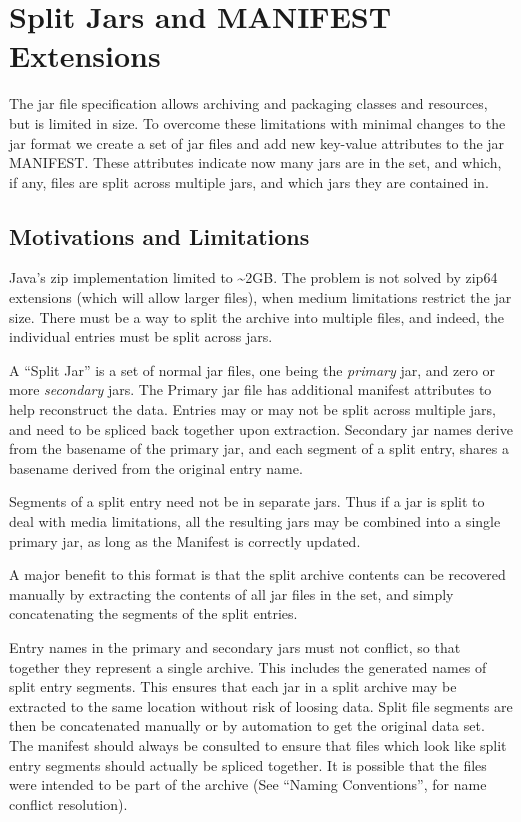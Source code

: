 \documentclass[a4paper, 12pt, pdftex]{report}
\begin{document}

\appendix

\chapter{Split Jars and MANIFEST Extensions}

The jar file specification allows archiving and packaging classes and
resources, but is limited in size. To overcome these limitations with
minimal changes to the jar format we create a set of jar files and add
new key-value attributes to the jar MANIFEST. These attributes
indicate now many jars are in the set, and which, if any, files are
split across multiple jars, and which jars they are contained in.

\section{Motivations and Limitations}

Java's zip implementation limited to \~{}2GB. The problem is not solved
by zip64 extensions (which will allow larger files), when medium limitations
restrict the jar size. There must be a way to split the archive into
multiple files, and indeed, the individual entries must be split
across jars.

A ``Split Jar'' is a set of normal jar files, one being the
\emph{primary} jar, and zero or more \emph{secondary} jars. The
Primary jar file has additional manifest attributes to help
reconstruct the data. Entries may or may not be split across multiple
jars, and need to be spliced back together upon extraction. Secondary
jar names derive from the basename of the primary jar, and each
segment of a split entry, shares a basename derived from the original
entry name.

Segments of a split entry need not be in separate jars. Thus if a jar
is split to deal with media limitations, all the resulting jars may be
combined into a single primary jar, as long as the Manifest is
correctly updated.

A major benefit to this format is that the split archive contents can
be recovered manually by extracting the contents of all jar files in
the set, and simply concatenating the segments of the split entries.

Entry names in the primary and secondary jars must not conflict, so
that together they represent a single archive. This includes the
generated names of split entry segments. This ensures that each jar in
a split archive may be extracted to the same location without risk of
loosing data. Split file segments are then be concatenated manually or
by automation to get the original data set. The manifest should always
be consulted to ensure that files which look like split entry segments
should actually be spliced together. It is possible that the files
were intended to be part of the archive (See ``Naming Conventions'',
for name conflict resolution).
\end{document}

